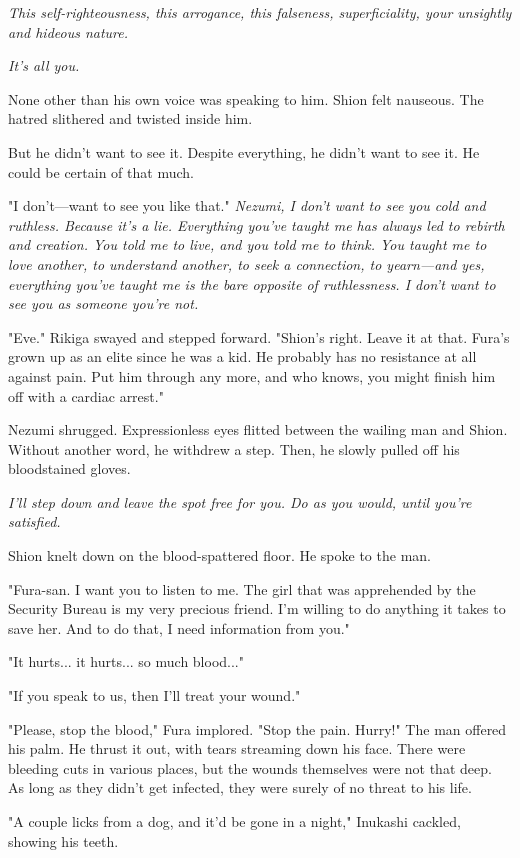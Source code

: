 \emph{This self-righteousness, this arrogance, this falseness, superficiality,
your unsightly and hideous nature.}

\emph{It's all you.}

None other than his own voice was speaking to him. Shion felt nauseous.
The hatred slithered and twisted inside him.

But he didn't want to see it. Despite everything, he didn't want to see
it. He could be certain of that much.

"I don't---want to see you like that." \emph{Nezumi, I don't want to see you
cold and ruthless. Because it's a lie. Everything you've taught me has
always led to rebirth and creation. You told me to live, and you told me
to think. You taught me to love another, to understand another, to seek
a connection, to yearn---and yes, everything you've taught me is the bare
opposite of ruthlessness. I don't want to see you as someone you're not.}

"Eve." Rikiga swayed and stepped forward. "Shion's right. Leave it at
that. Fura's grown up as an elite since he was a kid. He probably has no
resistance at all against pain. Put him through any more, and who knows,
you might finish him off with a cardiac arrest."

Nezumi shrugged. Expressionless eyes flitted between the wailing man and
Shion. Without another word, he withdrew a step. Then, he slowly pulled
off his bloodstained gloves.

\emph{I'll step down and leave the spot free for you. Do as you would, until
you're satisfied.}

Shion knelt down on the blood-spattered floor. He spoke to the man.

"Fura-san. I want you to listen to me. The girl that was apprehended by
the Security Bureau is my very precious friend. I'm willing to do
anything it takes to save her. And to do that, I need information from
you."

"It hurts... it hurts... so much blood..."

"If you speak to us, then I'll treat your wound."

"Please, stop the blood," Fura implored. "Stop the pain. Hurry!" The man
offered his palm. He thrust it out, with tears streaming down his face.
There were bleeding cuts in various places, but the wounds themselves
were not that deep. As long as they didn't get infected, they were
surely of no threat to his life.

"A couple licks from a dog, and it'd be gone in a night," Inukashi
cackled, showing his teeth.

